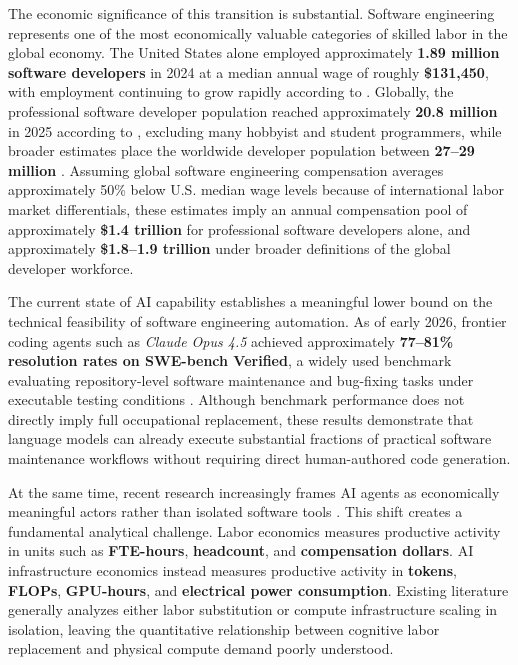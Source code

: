 \documentclass{article}
\begin{document}
The economic significance of this transition is substantial. Software engineering represents one of the most economically valuable categories of skilled labor in the global economy. The United States alone employed approximately \textbf{1.89 million software developers} in 2024 at a median annual wage of roughly \textbf{\$131,450}, with employment continuing to grow rapidly according to \citet{bls2024oes}. Globally, the professional software developer population reached approximately \textbf{20.8 million} in 2025 according to \citet{jetbrains2025survey}, excluding many hobbyist and student programmers, while broader estimates place the worldwide developer population between \textbf{27--29 million} \citep{evans2025developers}. Assuming global software engineering compensation averages approximately 50\% below U.S. median wage levels because of international labor market differentials, these estimates imply an annual compensation pool of approximately \textbf{\$1.4 trillion} for professional software developers alone, and approximately \textbf{\$1.8--1.9 trillion} under broader definitions of the global developer workforce.

The current state of AI capability establishes a meaningful lower bound on the technical feasibility of software engineering automation. As of early 2026, frontier coding agents such as \textit{Claude Opus 4.5} achieved approximately \textbf{77--81\% resolution rates on SWE-bench Verified}, a widely used benchmark evaluating repository-level software maintenance and bug-fixing tasks under executable testing conditions \citep{swebench2026, anthropic2025opus45}. Although benchmark performance does not directly imply full occupational replacement, these results demonstrate that language models can already execute substantial fractions of practical software maintenance workflows without requiring direct human-authored code generation.

At the same time, recent research increasingly frames AI agents as economically meaningful actors rather than isolated software tools \citep{rothschild2025agentic}. This shift creates a fundamental analytical challenge. Labor economics measures productive activity in units such as \textbf{FTE-hours}, \textbf{headcount}, and \textbf{compensation dollars}. AI infrastructure economics instead measures productive activity in \textbf{tokens}, \textbf{FLOPs}, \textbf{GPU-hours}, and \textbf{electrical power consumption}. Existing literature generally analyzes either labor substitution or compute infrastructure scaling in isolation, leaving the quantitative relationship between cognitive labor replacement and physical compute demand poorly understood.
\end{document}
